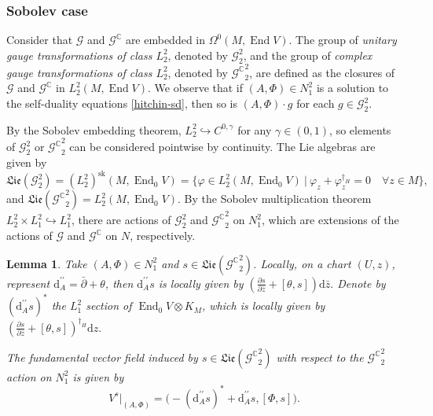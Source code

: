 \documentclass[a4paper]{amsart}
\newtheorem{lemma}[theorem]{Lemma}
\theoremstyle{definition}
\theoremstyle{remark}
\numberwithin{equation}{section}
\begin{document}
\subsubsection{Sobolev case}
Consider that $\mathscr{G}$ and $\mathscr{G}^\mathbb{C}$ are embedded in $\Omega^0(M, \operatorname{End} V)$. The group of \textit{unitary gauge transformations of class $L_2^2$}, denoted by $\mathscr{G}_2^2$, and the group of \textit{complex gauge transformations of class $L_2^2$}, denoted by ${\mathscr{G}^\mathbb{C}}_2^2$, are defined as the closures of $\mathscr{G}$ and $\mathscr{G}^\mathbb{C}$ in $L_2^2(M, \operatorname{End} V)$. We observe that if $(A, \Phi)\in N_1^2$ is a solution to the self-duality equations \eqref{hitchin-sd}, then so is $(A, \Phi) \cdot g$ for each $g \in \mathscr{G}_2^2$.

By the Sobolev embedding theorem, $L_2^2 \hookrightarrow C^{0, \gamma}$ for any $\gamma \in (0,1)$, so elements of $\mathscr{G}_2^2$ or ${\mathscr{G}^\mathbb{C}}_2^2$ can be considered pointwise by continuity. The Lie algebras are given by
\[
\mathfrak{Lie}(\mathscr{G}_2^2) = (L_2^2)^{\text{sk}}(M, \operatorname{End}_0 V) = \Big\{ \varphi \in L_2^2(M, \operatorname{End}_0 V) \ \Big|\ \varphi_z + \varphi_z^{\dagger_H} = 0 \quad\forall z\in M \Big\},
\]
and $\mathfrak{Lie}({\mathscr{G}^\mathbb{C}}_2^2) = L_2^2(M, \operatorname{End}_0 V)$. By the Sobolev multiplication theorem $L_2^2 \times L_1^2 \hookrightarrow L_1^2$, there are actions of $\mathscr{G}_2^2$ and ${\mathscr{G}^\mathbb{C}}_2^2$ on $N_1^2$, which are extensions of the actions of $\mathscr{G}$ and ${\mathscr{G}^\mathbb{C}}$ on $N$, respectively. 

\begin{lemma}\label{FF}
Take $(A,\Phi) \in N_1^2$ and $s \in \mathfrak{Lie}({\mathcal{G}^\mathbb{C}}_2^2)$. Locally, on a chart $(U, z)$, represent $\mathrm{d}_A^{\prime\prime} = \bar{\partial} + \theta$, then $\mathrm{d}_A^{\prime\prime}s$ is locally given by $\left(\frac{\partial s}{\partial \bar{z}} + [\theta, s]\right) \mathrm{d}\bar{z}.$ Denote by $(\mathrm{d}_A^{\prime\prime}s)^*$ the $L_1^2$ section of $\operatorname{End}_0V \otimes K_M$, which is locally given by $\left(\frac{\partial s}{\partial \bar{z}} + [\theta, s]\right)^{\dagger_H} \mathrm{d}z.$ 

The fundamental vector field induced by $s \in \mathfrak{Lie}({\mathcal{G}^\mathbb{C}}_2^2)$ with respect to the ${\mathcal{G}^\mathbb{C}}^2_2$ action on $N_1^2$ is given by
\[
V^s\Big|_{(A,\Phi)} = \Big(- (\mathrm{d}_A^{\prime\prime}s)^* + \mathrm{d}_A^{\prime\prime}s, [\Phi, s]\Big).
\]
\end{lemma}
\end{document}

